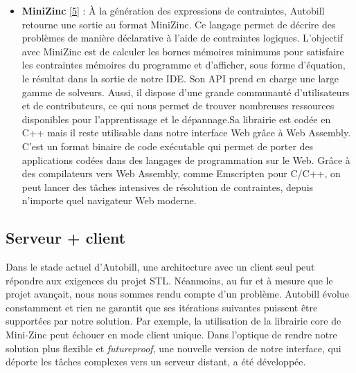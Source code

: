 \documentclass[12pt]{article}
\begin{document}
      \begin{itemize}
            \item
                  \textbf{MiniZinc} \protect\hyperlink{ref-minizinc}{{[}5{]}} : À la
                  génération des expressions de contraintes, Autobill retourne une
                  sortie au format MiniZinc. Ce langage permet de décrire des problèmes
                  de manière déclarative à l'aide de contraintes logiques. L'objectif
                  avec MiniZinc est de calculer les bornes mémoires minimums pour
                  satisfaire les contraintes mémoires du programme et d'afficher, sous
                  forme d'équation, le résultat dans la sortie de notre IDE. Son API
                  prend en charge une large gamme de solveurs. Aussi, il dispose d'une
                  grande communauté d'utilisateurs et de contributeurs, ce qui nous
                  permet de trouver nombreuses ressources disponibles pour
                  l'apprentissage et le dépannage.\newline  Sa librairie est codée en
                  C++ mais il reste utilisable dans notre interface Web grâce à Web
                  Assembly. C'est un format binaire de code exécutable qui permet de
                  porter des applications codées dans des langages de programmation sur
                  le Web. Grâce à des compilateurs vers Web Assembly, comme Emscripten
                  pour C/C++, on peut lancer des tâches intensives de résolution de
                  contraintes, depuis n'importe quel navigateur Web moderne.
      \end{itemize}
\fi

\hypertarget{serveur-client}{%
  \subsection{Serveur + client}\label{serveur-client}}

Dans le stade actuel d'Autobill, une architecture avec un client seul
peut répondre aux exigences du projet STL. Néanmoins, au fur et à mesure que le projet avançait, nous nous sommes rendu compte d'un problème. Autobill évolue constamment et rien ne garantit que ses itérations suivantes puissent
être supportées par notre solution. Par exemple, la utilisation de la librairie core de Mini-Zinc peut échouer en mode client unique. Dans l'optique de rendre notre solution plus flexible et \emph{futureproof}, une nouvelle version de notre interface, qui déporte les tâches complexes vers un serveur
distant, a été développée.
\end{document}
